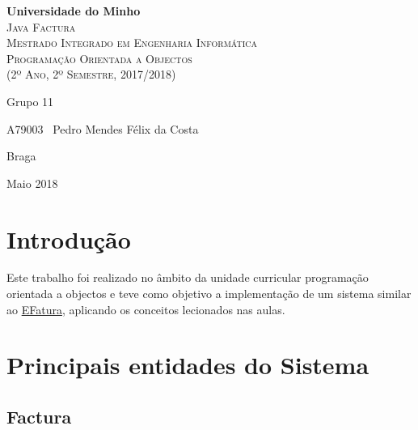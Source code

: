 \documentclass[12pt,a4paper]{report}
\begin{document}
\begin{titlepage}
    \center
    {\huge {\bf Universidade do Minho}}\\[0.4cm]
    \vspace{3.0cm}
    \textsc{\huge{Java Factura}}\\[0.5cm]
    \vspace{3.0cm}
    \textsc{\huge{Mestrado Integrado em Engenharia Informática}}\\[0.5cm]
    \vspace{2.0cm}
    \textsc{Programação Orientada a Objectos}\\[0.5cm]
    \textsc{(2º Ano, 2º Semestre, 2017/2018)}\\[0.5cm]
    \vspace{1.5cm}
    \begin{flushleft}
        Grupo 11
        \vspace{1cm}

        A79003 \,\,\,Pedro Mendes Félix da Costa
    \end{flushleft}
        \vspace{1cm}
    \begin{flushright}
        Braga

        Maio 2018
    \end{flushright}

\end{titlepage}

\tableofcontents
\listoffigures

\chapter{Introdução}
    Este trabalho foi realizado no âmbito da unidade curricular programação
    orientada a objectos e teve como objetivo a implementação de um sistema
    similar ao \href{https://faturas.portaldasfinancas.gov.pt}{EFatura},
    aplicando os conceitos lecionados nas aulas.

\chapter{Principais entidades do Sistema}
    \section{Factura}
\end{document}
